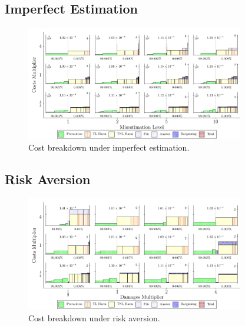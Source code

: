 \documentclass{article}
\begin{document}
\subsection{Imperfect Estimation}
\begin{figure}[ht]
  \centering
  \includegraphics[width=0.85\textwidth]{../Figures/Cost Breakdown Misestimation Level (All Rows).pdf}
  \caption{Cost breakdown under imperfect estimation.}
  \label{fig:imperfect_estimation}
\end{figure}

\FloatBarrier
\subsection{Risk Aversion}
\begin{figure}[ht]
  \centering
  \includegraphics[width=0.85\textwidth]{../Figures/Cost Breakdown Damages Multiplier (Risk Averse) (All Rows).pdf}
  \caption{Cost breakdown under risk aversion.}
  \label{fig:risk_aversion}
\end{figure}

\FloatBarrier
\end{document}
